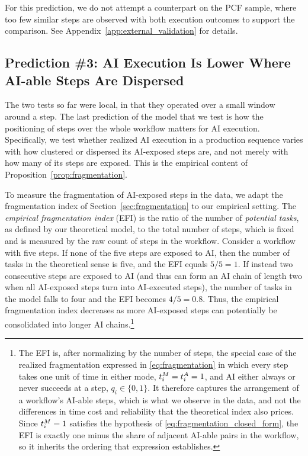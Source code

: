 For this prediction, we do not attempt a counterpart on the PCF sample, where too few similar steps are observed with both execution outcomes to support the comparison. See Appendix~\ref{app:external_validation} for details.



\subsection{Prediction \#3: AI Execution Is Lower Where AI-able Steps Are Dispersed}
\label{sec:fragmentation_prediction}

The two tests so far were local, in that they operated over a small window around a step.
The last prediction of the model that we test is how the positioning of steps over the whole workflow matters for AI execution.
Specifically, we test whether realized AI execution in a production sequence varies with how clustered or dispersed its AI-exposed steps are, and not merely with how many of its steps are exposed.
This is the empirical content of Proposition~\ref{prop:fragmentation}.

To measure the fragmentation of AI-exposed steps in the data, we adapt the fragmentation index of Section~\ref{sec:fragmentation} to our empirical setting.
The \emph{empirical fragmentation index} (EFI) is the ratio of the number of \emph{potential tasks}, as defined by our theoretical model, to the total number of steps, which is fixed and is measured by the raw count of steps in the workflow.
Consider a workflow with five steps.
If none of the five steps are exposed to AI, then the number of tasks in the theoretical sense is five, and the EFI equals $5/5 = 1$.
If instead two consecutive steps are exposed to AI (and thus can form an AI chain of length two when all AI-exposed steps turn into AI-executed steps), the number of tasks in the model falls to four and the EFI becomes $4/5 = 0.8$.
Thus, the empirical fragmentation index decreases as more AI-exposed steps can potentially be consolidated into longer AI chains.\footnote{The EFI is, after normalizing by the number of steps, the special case of the realized fragmentation expressed in \eqref{eq:fragmentation} in which every step takes one unit of time in either mode, $t^{M}_{i} = t^{A}_{i} = 1$, and AI either always or never succeeds at a step, $q_i \in \{0,1\}$.
It therefore captures the arrangement of a workflow's AI-able steps, which is what we observe in the data, and not the differences in time cost and reliability that the theoretical index also prices.
Since $t^{M}_{i} = 1$ satisfies the hypothesis of \eqref{eq:fragmentation_closed_form}, the EFI is exactly one minus the share of adjacent AI-able pairs in the workflow, so it inherits the ordering that expression establishes.}

